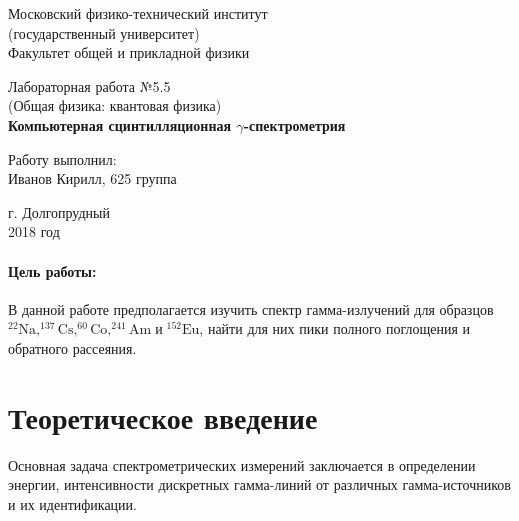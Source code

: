 \documentclass[12pt]{kiarticle}
\newcommand{\ga}{\ensuremath{\gamma}}
\begin{document}
	
	\begin{titlepage}
		\begin{center}
			\large 	Московский физико-технический институт \\
			(государственный университет) \\
			Факультет общей и прикладной физики \\
			\vspace{0.2cm}
			
			\vspace{4.5cm}
			Лабораторная работа №5.5  \\ \vspace{0.2cm}
			\large (Общая физика: квантовая физика) \\ \vspace{0.2cm}
			\LARGE \textbf{Компьютерная сцинтилляционная \ga-спектрометрия }
		\end{center}
		\vspace{2.3cm} \large
		
		\begin{center}
			Работу выполнил: \\
			Иванов Кирилл,
			625 группа
			\vspace{10mm}		
			
		\end{center}
		
		\begin{center} \vspace{60mm}
			г. Долгопрудный \\
			2018 год
		\end{center}
	\end{titlepage}


	\paragraph*{Цель работы:} В данной работе предполагается изучить спектр гамма-излучений для образцов $ \mathrm{^{22}Na, ^{137}Cs, ^{60}Co, ^{241}Am \;} и \mathrm{\; ^{152}Eu}$, найти для них пики полного поглощения и обратного рассеяния.
	
	
	
	\section{Теоретическое введение}
	
	Основная задача спектрометрических измерений заключается в определении энергии, интенсивности дискретных гамма-линий от различных гамма-источников и их идентификации.
	
\end{document}
